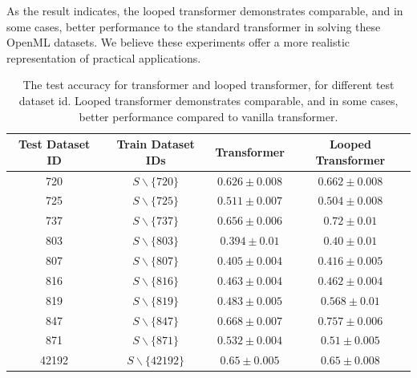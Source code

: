 \documentclass{article} %
\theoremstyle{plain}
\theoremstyle{definition}
\theoremstyle{remark}
\begin{document}
{As the result indicates, the looped transformer demonstrates comparable, and in some cases, better performance to the standard transformer in solving these OpenML datasets. We believe these experiments offer a more realistic representation of practical applications.

\begin{table}[h]
\centering
\begin{tabular}{cccc}
\toprule
Test Dataset ID & Train Dataset IDs & Transformer & Looped Transformer \\
\midrule
720  & $S \backslash \{720\}$ & $0.626 \pm 0.008$ & $\bm{0.662 \pm 0.008}$ \\
725  & $S \backslash \{725\}$  & $0.511 \pm 0.007$ & ${0.504 \pm 0.008}$ \\
737  & $S \backslash \{737\}$  & $0.656 \pm 0.006$ & $\bm{0.72 \pm 0.01}$ \\
803  & $S \backslash \{803\}$ & $0.394 \pm 0.01$ & ${0.40 \pm 0.01}$ \\
807  & $S \backslash \{807\}$ & $0.405 \pm 0.004$ & $\bm{0.416 \pm 0.005}$ \\
816  & $S \backslash \{816\}$ & $0.463 \pm 0.004$ & ${0.462 \pm 0.004}$ \\
819  & $S \backslash \{819\}$ & $0.483 \pm 0.005$ & $\bm{0.568 \pm 0.01}$ \\
847  & $S \backslash \{847\}$ & $0.668 \pm 0.007$ & $\bm{0.757 \pm 0.006}$ \\
871  & $S \backslash \{871\}$ & $\bm{0.532 \pm 0.004}$ & ${0.51 \pm 0.005}$ \\
42192 & $S \backslash \{42192\}$ & $0.65 \pm 0.005$ & ${0.65 \pm 0.008}$ \\
\bottomrule
\end{tabular}
\caption{The test accuracy for transformer and looped transformer, for different test dataset id. Looped transformer demonstrates comparable, and in some cases, better performance compared to vanilla transformer.}
\label{table:openml_results}
\end{table}
}
\end{document}
